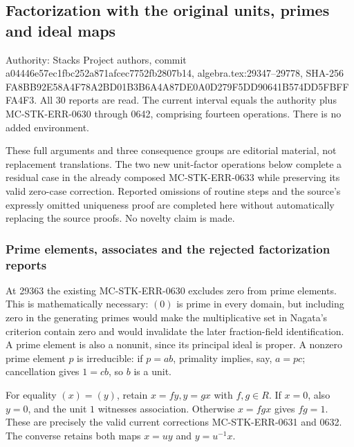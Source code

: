 \subsection{Factorization with the original units, primes and ideal maps}\label{algebra-proof-029-factorization-with-the-original-units-primes-and-ideal-maps}

Authority: Stacks Project authors, commit a04446e57ec1fbc252a871afcec7752fb2807b14, algebra.tex:29347--29778, SHA-256 FA8BB92E58A4F78A2BD01B3B6A4A87DE0A0D279F5DD90641B574DD5FBFFFA4F3. All 30 reports are read. The current interval equals the authority plus MC-STK-ERR-0630 through 0642, comprising fourteen operations. There is no added environment.

These full arguments and three consequence groups are editorial material, not replacement translations. The two new unit-factor operations below complete a residual case in the already composed MC-STK-ERR-0633 while preserving its valid zero-case correction. Reported omissions of routine steps and the source's expressly omitted uniqueness proof are completed here without automatically replacing the source proofs. No novelty claim is made.

\subsubsection{Prime elements, associates and the rejected factorization reports}\label{algebra-proof-029-prime-elements-associates-and-the-rejected-factorization-reports}

At 29363 the existing MC-STK-ERR-0630 excludes zero from prime elements. This is mathematically necessary: \((0)\) is prime in every domain, but including zero in the generating primes would make the multiplicative set in Nagata's criterion contain zero and would invalidate the later fraction-field identification. A prime element is also a nonunit, since its principal ideal is proper. A nonzero prime element \(p\) is irreducible: if \(p=ab\), primality implies, say, \(a=pc\); cancellation gives \(1=cb\), so \(b\) is a unit.

For equality \((x)=(y)\), retain \(x=fy,y=gx\) with \(f,g\in R\). If \(x=0\), also \(y=0\), and the unit \(1\) witnesses association. Otherwise \(x=fgx\) gives \(fg=1\). These are precisely the valid current corrections MC-STK-ERR-0631 and 0632. The converse retains both maps \(x=uy\) and \(y=u^{-1}x\).

